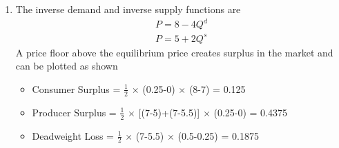 \documentclass{article}
\begin{document}
\begin{enumerate}
\[        \]
        Solving this gives $Q=10$ units and substituting this back into the monopolist's demand curve gives $P = \$80$ \\
    \item
        The inverse demand and inverse supply functions are 
        \begin{align}
        P=8-4Q^d \tag{1} \\
        P=5+2Q^s \tag{2}
        \end{align}
        A price floor above the equilibrium price creates surplus in the market and can be plotted as shown \\
        \begin{center}
        \end{center}
        \begin{itemize}
        \item Consumer Surplus = \(\frac{1}{2}\) $\times$ (0.25-0) $\times$ (8-7) = 0.125 \\
        \item Producer Surplus = \(\frac{1}{2}\) $\times$ [(7-5)+(7-5.5)] $\times$ (0.25-0) = 0.4375 \\
        \item Deadweight Loss = \(\frac{1}{2}\) $\times$ (7-5.5) $\times$ (0.5-0.25) = 0.1875 \\
        \end{itemize}
\end{enumerate}
\end{document}
